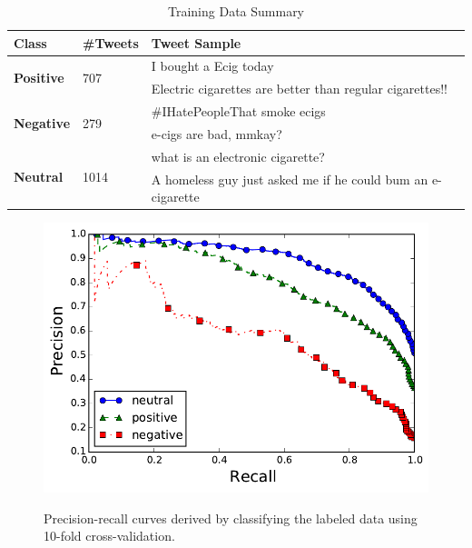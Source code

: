\documentclass{sig-alternate}
\begin{document}
\begin{table}[t]
\centering
\caption{Training Data Summary}
\label{tab:labelsample}
\begin{tabular}{|l|l|p{9cm}|}
\hline
{\bf Class}                     & {\bf \#Tweets}        & {\bf Tweet Sample}                                                                                                                       \\ \hline
\multirow{2}{*}{{\bf Positive}} & \multirow{2}{*}{707}  & I bought a Ecig today                                                                                                                    \\ %
                                &                       & Electric cigarettes are better than regular cigarettes!!                                          \\ \hline
\multirow{2}{*}{{\bf Negative}} & \multirow{2}{*}{279}  & \#IHatePeopleThat smoke ecigs                                                  \\ %
                                &                       & e-cigs are bad, mmkay?                                                                                                         \\ \hline
\multirow{2}{*}{{\bf Neutral}}  & \multirow{2}{*}{1014} &  what is an electronic cigarette?        \\ %
                                &                       & A homeless guy just asked me if he could bum an e-cigarette\\ \hline
\end{tabular}
\end{table}

\begin{figure}[t]
\caption{Precision-recall curves derived by classifying the labeled data using 10-fold cross-validation.}
\includegraphics[width=\columnwidth]{nb/prec_rec.pdf}  %
\centering
\label{f.prec_rec}
\end{figure}
\end{document}
